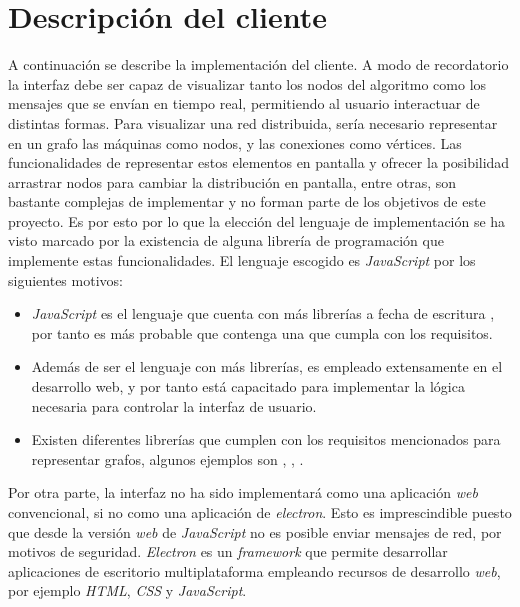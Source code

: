 \section{Descripción del cliente}

A continuación se describe la implementación del cliente. A modo de recordatorio la interfaz debe ser capaz de visualizar tanto los nodos del algoritmo como los mensajes que se envían en tiempo real, permitiendo al usuario interactuar de distintas formas. Para visualizar una red distribuida, sería necesario representar en un grafo las máquinas como nodos, y las conexiones como vértices. Las funcionalidades de representar estos elementos en pantalla y ofrecer la posibilidad arrastrar nodos para cambiar la distribución en pantalla, entre otras, son bastante complejas de implementar y no forman parte de los objetivos de este proyecto. Es por esto por lo que la elección del lenguaje de implementación se ha visto marcado por la existencia de alguna librería de programación que implemente estas funcionalidades. El lenguaje escogido es \textit{JavaScript} por los siguientes motivos:

\begin{itemize}
\item \textit{JavaScript} \cite{js} es el lenguaje que cuenta con más librerías a fecha de escritura \cite{libraries}, por tanto es más probable que contenga una que cumpla con los requisitos.

\item Además de ser el lenguaje con más librerías, es empleado extensamente en el desarrollo web, y por tanto está capacitado para implementar la lógica necesaria para controlar la interfaz de usuario.

\item Existen diferentes librerías que cumplen con los requisitos mencionados para representar grafos, algunos ejemplos son \cite{visjs}, \cite{gojs}, \cite{10.1093/bioinformatics/btv557}.
\end{itemize}

Por otra parte, la interfaz no ha sido implementará como una aplicación \textit{web} convencional, si no como una aplicación de \textit{electron}. Esto es imprescindible puesto que desde la versión \textit{web} de \textit{JavaScript} no es posible enviar mensajes de red, por motivos de seguridad. \textit{Electron}\cite{electron} es un \textit{framework} que permite desarrollar aplicaciones de escritorio multiplataforma empleando recursos de desarrollo \textit{web}, por ejemplo \textit{HTML}, \textit{CSS} y \textit{JavaScript}.

